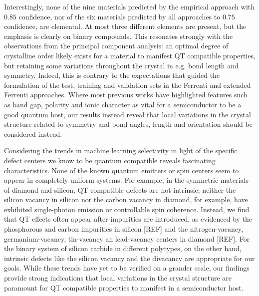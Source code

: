 \documentclass[superscriptaddress,unsortedaddress,
 amsmath,amssymb,
 aps,
]{revtex4-2}
\begin{document}
Interestingly, none of the nine materials predicted by the empirical approach with $0.85$ confidence, nor of the six materials predicted by all approaches to $0.75$ confidence, are elemental. At most three different elements are present, but the emphasis is clearly on binary compounds. This resonates strongly with the observations from the principal component analysis: an optimal degree of crystalline order likely exists for a material to manifest QT compatible properties, but retaining some variations throughout the crystal in e.g. bond length and symmetry.  Indeed, this is 
contrary to the expectations that guided the formulation of the test, training and validation sets in the Ferrenti and extended Ferrenti approaches. Where most previous works have highlighted features such as band gap, polarity and ionic character as vital for a semiconductor to be a good quantum host, our results instead reveal that local variations in the crystal structure related to symmetry and bond angles, length and orientation should be considered 
instead. 


Considering the trends in machine learning selectivity in light of the specific defect centers we know to be quantum compatible reveals fascinating characteristics. None of the known quantum emitters or spin centers seem to appear in completely uniform systems. For example, in the symmetric materials of diamond and silicon, QT compatible defects are not intrinsic; neither the silicon vacancy in silicon nor the carbon vacancy in diamond, for example,  have exhibited single-photon emission or controllable spin coherence. Instead, we find that QT effects often appear after impurities are introduced, as evidenced by the phosphorous and carbon impurities in silicon [REF] and the nitrogen-vacancy, germanium-vacancy, tin-vacancy an lead-vacancy centers in diamond [REF]. 
For the binary system of silicon carbide in different polytypes, on the other hand, intrinsic defects like the silicon vacancy and the divacancy are appropriate for our goals. 
While these trends have yet to be verified on a grander scale, our findings provide strong indications that local variations in the crystal structure are paramount for QT  compatible properties to manifest in a semiconductor host. 


\end{document}
